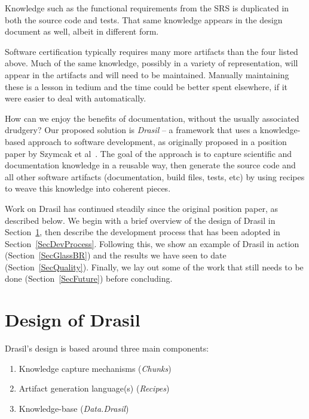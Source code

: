 \documentclass[sigconf]{acmart}
\begin{document}
Knowledge such as the functional requirements from the SRS is duplicated in 
both the source code and tests. That same knowledge appears in the design 
document as well, albeit in different form. 

Software certification typically requires many more 
artifacts than the four listed above. Much of the same knowledge, possibly in a
variety of representation, will appear in the artifacts and will need to be
maintained. Manually maintaining these is a lesson in tedium and the
time could be better spent elsewhere, if 
it were easier to deal with automatically.


How can we enjoy the benefits of documentation, without the usually associated
drudgery?  Our proposed solution is \textit{Drasil} -- a framework that uses
a knowledge-based approach to software development, as originally proposed in a
position paper by Szymcak et al~\cite{SzymczakEtAl2016}. The goal of the
approach is to capture scientific and documentation knowledge in a reusable way,
then generate the source code and all other software artifacts
(documentation, build files, tests, etc) by using recipes to weave this
knowledge into coherent pieces.

Work on Drasil has continued steadily since the original position paper, as
described below. We begin with a brief overview of the design of Drasil
in Section~\ref{SecDesign}, then describe the development process that
has been adopted in Section~\ref{SecDevProcess}. Following this, we show an example of
Drasil in action (Section~\ref{SecGlassBR}) and the results we have seen to date
(Section~\ref{SecQuality}). Finally, we lay out some of the work that still
needs to be done (Section~\ref{SecFuture}) before concluding.

\section{Design of Drasil} \label{SecDesign}

Drasil's design is based around three main components:
\begin{enumerate}
    \item Knowledge capture mechanisms (\textit{Chunks})
    \item Artifact generation language(s) (\textit{Recipes})
    \item Knowledge-base (\textit{Data.Drasil})
\end{enumerate}
\end{document}
